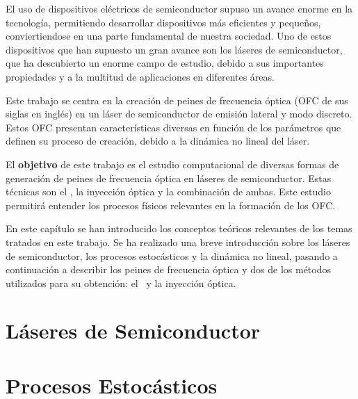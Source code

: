 El uso de dispositivos el\'ectricos de semiconductor supuso un avance enorme en la tecnolog\'ia, permitiendo desarrollar dispositivos m\'as eficientes y pequeños, conviertiendose en una parte fundamental de nuestra sociedad. Uno de estos dispositivos que han supuesto un gran avance son los l\'aseres de semiconductor, que ha descubierto un enorme campo de estudio, debido a sus importantes propiedades y a la multitud de aplicaciones en diferentes \'areas.

Este trabajo se centra en la creaci\'on de peines de frecuencia \'optica (OFC de sus siglas en ingl\'es) en un l\'aser de semiconductor de emisi\'on lateral y modo discreto. Estos OFC presentan caracter\'isticas diversas en funci\'on de los par\'ametros que definen su proceso de creaci\'on, debido a la din\'amica no lineal del l\'aser.

El \textbf{objetivo} de este trabajo es el estudio computacional de diversas formas de generación de peines de frecuencia \'optica en l\'aseres de semiconductor. Estas técnicas son el \gs, la inyecci\'on \'optica y la combinación de ambas. Este estudio permitir\'a entender los procesos f\'isicos relevantes en la formaci\'on de los OFC.

En este cap\'itulo se han introducido los conceptos te\'oricos relevantes de los temas tratados en este trabajo. Se ha realizado una breve introducci\'on sobre los l\'aseres de semiconductor, los procesos estoc\'asticos y la din\'amica no lineal, pasando a continuaci\'on a describir los peines de frecuencia \'optica y dos de los m\'etodos utilizados para su obtenci\'on: el \gs\ y la inyecci\'on \'optica.

	\section{Láseres de Semiconductor}
		\label{Intr:LsrSmcdtr}
		
		

	\section{Procesos Estocásticos}
		\label{Intr:PrcsEstcs}
		
		

